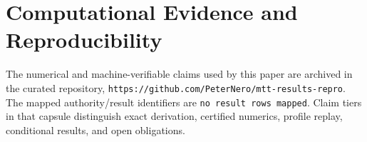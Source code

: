 \documentclass[11pt]{article}
\begin{document}
\section*{Computational Evidence and Reproducibility}
The numerical and machine-verifiable claims used by this paper are archived in the curated repository, \texttt{https://github.com/PeterNero/mtt-results-repro}. The mapped authority/result identifiers are \texttt{no result rows mapped}. Claim tiers in that capsule distinguish exact derivation, certified numerics, profile replay, conditional results, and open obligations.
\end{document}
